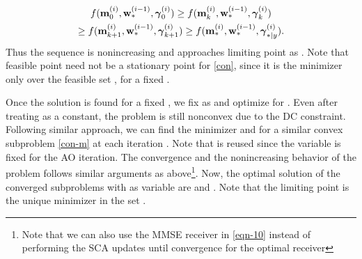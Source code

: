 \begin{multline} \label{con-convergence}
f(\iter{\mx}{0}{i},\iter{\my}{\ast}{i-1},\iter{\mz}{0}{i}) \geq f(\iter{\mx}{k}{i},\iter{\my}{\ast}{i-1},\iter{\mz}{k}{i}) \\ \geq f(\iter{\mx}{k+1}{i},\iter{\my}{\ast}{i-1},\iter{\mz}{k+1}{i}) \geq f(\iter{\mx}{\ast}{i},\iter{\my}{\ast}{i-1},\iter{\mz}{\ast|y}{i}). 
\end{multline}
Thus the sequence  is nonincreasing and approaches limiting point as . Note that feasible point  need not be a stationary point for \eqref{con}, since it is the minimizer only over the feasible set , for a fixed \me{\my}.

Once the solution is found for a fixed \me{\my}, we fix \me{\mx} as  and optimize for \me{\my}. Even after treating \me{\mx} as a constant, the problem is still nonconvex due to the \ac{DC} constraint. Following similar approach, we can find the minimizer  and  for a similar convex subproblem \eqref{con-m} at each iteration . Note that  is reused since the variable \me{\mx} is fixed for the  \ac{AO} iteration. The convergence and the nonincreasing behavior of the problem follows similar arguments as above\footnote{Note that we can also use the \ac{MMSE} receiver in \eqref{eqn-10} instead of performing the \ac{SCA} updates until convergence for the optimal receiver}. Now, the optimal solution of the converged subproblems with \me{\my} as variable are  and . Note that the limiting point  is the unique minimizer in the set .

